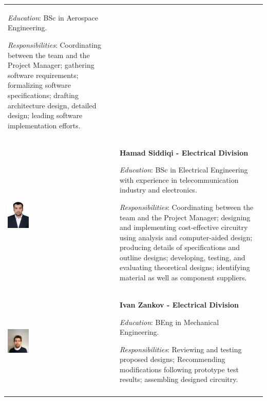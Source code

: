 \begin{longtable}[]{m{} m{}}
\smallskip
\textit{Education}: BSc in Aerospace Engineering.


\smallskip 
\textit{Responsibilities}: Coordinating between the team and the Project Manager; gathering software requirements; formalizing software specifications; drafting architecture design, detailed design; leading software implementation efforts.
\bigskip
\\

\includegraphics[width=0.2\textwidth]{1-introduction/img/hamad-saddiqi.jpg} & \textbf{Hamad Siddiqi - Electrical Division}

\smallskip
\textit{Education}: BSc in Electrical Engineering with experience in telecommunication industry and electronics.

\smallskip
\textit{Responsibilities}: Coordinating between the team and the Project Manager; designing and implementing cost-effective circuitry using analysis and computer-aided design; producing details of specifications and outline designs; developing, testing, and evaluating theoretical designs; identifying material as well as component suppliers. 
\bigskip
\\


\includegraphics[width=0.2\textwidth]{1-introduction/img/ivan-zankov.jpg} & \textbf{Ivan Zankov - Electrical Division}

\smallskip
\textit{Education}: BEng in Mechanical Engineering.

\smallskip
\textit{Responsibilities}: Reviewing and testing proposed designs; Recommending modifications following prototype test results; assembling designed circuitry.                                                          

\\
\label{tab:people}
\end{longtable}
\raggedbottom
